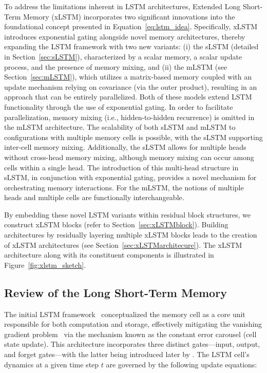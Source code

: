 To address the limitations inherent in LSTM architectures, Extended Long Short-Term Memory (xLSTM) incorporates two significant innovations into the foundational concept presented in Equation~\eqref{eq:lstm_idea}. Specifically, xLSTM introduces exponential gating alongside novel memory architectures, thereby expanding the LSTM framework with two new variants: (i) the sLSTM (detailed in Section~\ref{sec:sLSTM}), characterized by a scalar memory, a scalar update process, and the presence of memory mixing, and (ii) the mLSTM (see Section~\ref{sec:mLSTM}), which utilizes a matrix-based memory coupled with an update mechanism relying on covariance (via the outer product), resulting in an approach that can be entirely parallelized. Both of these models extend LSTM functionality through the use of exponential gating. In order to facilitate parallelization, memory mixing (i.e., hidden-to-hidden recurrence) is omitted in the mLSTM architecture. The scalability of both sLSTM and mLSTM to configurations with multiple memory cells is possible, with the sLSTM supporting inter-cell memory mixing. Additionally, the sLSTM allows for multiple heads without cross-head memory mixing, although memory mixing can occur among cells within a single head. The introduction of this multi-head structure in sLSTM, in conjunction with exponential gating, provides a novel mechanism for orchestrating memory interactions. For the mLSTM, the notions of multiple heads and multiple cells are functionally interchangeable.

By embedding these novel LSTM variants within residual block structures, we construct xLSTM blocks (refer to Section~\ref{sec:xLSTMblock}). Building architectures by residually layering multiple xLSTM blocks leads to the creation of xLSTM architectures (see Section~\ref{sec:xLSTMarchitecure}).
The xLSTM architecture along with its constituent components is illustrated in Figure~\ref{fig:xlstm_sketch}.

\subsection{Review of the Long Short-Term Memory}
\label{sec:orgLSTM}

The initial LSTM framework~\citep{Hochreiter:91,Hochreiter:97nips,Hochreiter:97} conceptualized the memory cell as a core unit responsible for both computation and storage, effectively mitigating the vanishing gradient problem~\citep{Hochreiter:91,Hochreiter:00book} via the mechanism known as the constant error carousel (cell state update). This architecture incorporates three distinct gates—input, output, and forget gates—with the latter being introduced later by \citet{Gers:00}. The LSTM cell’s dynamics at a given time step $t$ are governed by the following update equations:

